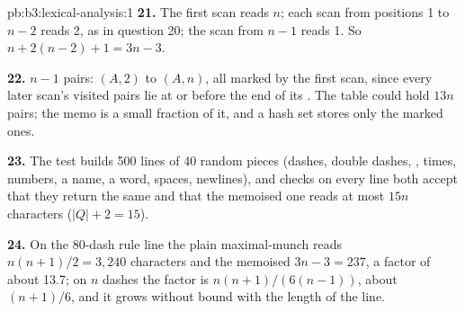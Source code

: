 \begin{solution}{pb:b3:lexical-analysis:1}
\textbf{21.} The first scan reads $n$; each scan from positions 1 to $n - 2$ reads 2, as in question 20; the scan from $n - 1$ reads 1. So $n + 2(n - 2) + 1 = 3n - 3$.

\textbf{22.} $n - 1$ pairs: $(A, 2)$ to $(A, n)$, all marked by the first scan, since every later scan's visited pairs lie at or before the end of its . The table could hold $13n$ pairs; the memo is a small fraction of it, and a hash set stores only the marked ones.

\textbf{23.} The test  builds 500 lines of 40 random pieces (dashes, double dashes, \code{>}, times, numbers, a name, a word, spaces, newlines), and checks on every line both  accept that they return the same  and that the memoised one reads at most $15n$ characters ($|Q| + 2 = 15$).

\textbf{24.} On the 80-dash rule line the plain maximal-munch  reads $n(n+1)/2 = 3{,}240$ characters and the memoised  $3n - 3 = 237$, a factor of about 13.7; on $n$ dashes the factor is $n(n+1)/(6(n-1))$, about $(n+1)/6$, and it grows without bound with the length of the line.
\end{solution}

